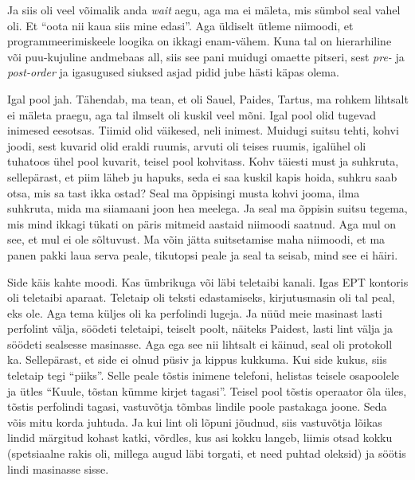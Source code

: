 Ja siis oli veel võimalik anda \emph{wait} aegu, aga ma ei mäleta, mis sümbol 
seal vahel oli. Et \enquote{oota nii kaua siis mine edasi}. Aga üldiselt ütleme 
niimoodi, et programmeerimiskeele loogika on ikkagi enam-vähem. Kuna tal on 
hierarhiline või puu-kujuline andmebaas all, siis see pani muidugi omaette 
pitseri, sest \emph{pre-} ja \emph{post-order} ja igasugused siuksed asjad 
pidid jube hästi käpas olema. 


Igal pool jah. Tähendab, ma tean, et oli Sauel, Paides, Tartus, ma rohkem 
lihtsalt ei mäleta praegu, aga tal ilmselt oli kuskil veel mõni. Igal pool olid 
tugevad inimesed eesotsas. Tiimid olid väikesed, neli inimest. Muidugi suitsu 
tehti, kohvi joodi, sest kuvarid olid eraldi ruumis, arvuti oli teises ruumis, 
igalühel oli tuhatoos ühel pool kuvarit, teisel pool kohvitass. Kohv täiesti 
must ja suhkruta, sellepärast, et piim läheb ju hapuks, seda ei saa kuskil 
kapis hoida, suhkru saab otsa, mis sa tast ikka ostad?  Seal ma õppisingi musta 
kohvi jooma, ilma suhkruta, mida ma siiamaani joon hea meelega. Ja seal ma 
õppisin suitsu tegema, mis mind ikkagi tükati on päris mitmeid aastaid niimoodi 
saatnud. Aga mul on see, et mul ei ole sõltuvust. Ma võin jätta suitsetamise 
maha niimoodi, et ma panen pakki laua serva peale, tikutopsi peale ja seal ta 
seisab, mind see ei häiri. 


Side käis kahte moodi. Kas ümbrikuga või läbi teletaibi kanali. Igas EPT 
kontoris oli teletaibi aparaat. Teletaip oli teksti edastamiseks, kirjutusmasin 
oli tal peal, eks ole. Aga tema küljes oli ka perfolindi lugeja. Ja nüüd meie  
masinast lasti perfolint välja, söödeti teletaipi, teiselt poolt,  näiteks 
Paidest, lasti lint välja ja söödeti sealsesse masinasse. Aga ega see nii 
lihtsalt ei käinud, seal oli protokoll ka. Sellepärast, et side ei olnud püsiv 
ja kippus kukkuma. Kui side kukus, siis teletaip tegi \enquote{piiks}. Selle 
peale tõstis inimene telefoni, helistas teisele osapoolele ja ütles 
\enquote{Kuule, tõstan kümme kirjet tagasi}. Teisel pool tõstis operaator õla 
üles, tõstis perfolindi tagasi, vastuvõtja tõmbas lindile poole pastakaga 
joone. Seda võis mitu korda juhtuda. Ja kui lint oli lõpuni jõudnud, siis 
vastuvõtja lõikas lindid märgitud kohast katki, võrdles, kus asi kokku langeb, 
liimis otsad kokku (spetsiaalne rakis oli, millega augud läbi torgati, et need 
puhtad oleksid) ja söötis lindi masinasse sisse. 

